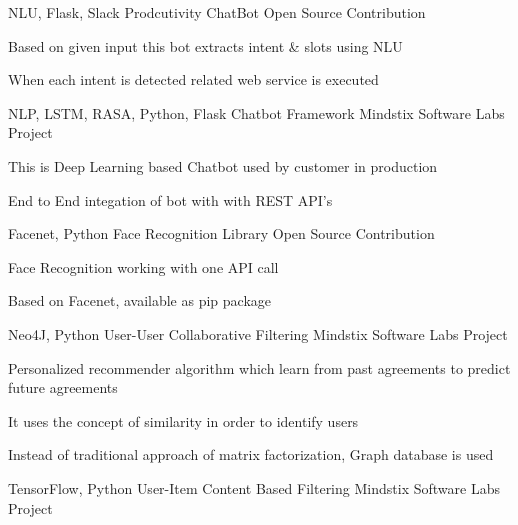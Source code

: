 \begin{cventries}
  \cventry
    {NLU, Flask, Slack} %
    {Prodcutivity ChatBot} %
    {Open Source Contribution} %
    {} %
    {
      \begin{cvitems} %
        \item {Based on given input this bot extracts intent \& slots using NLU}
        \item {When each intent is detected related web service is executed}
      \end{cvitems}
    }
  \cventry
    {NLP, LSTM, RASA, Python, Flask} %
    {Chatbot Framework} %
    {Mindstix Software Labs Project} %
    {} %
    {
      \begin{cvitems} %
        \item {This is Deep Learning based Chatbot used by customer in production}
        \item {End to End integation of bot with with REST API's }
      \end{cvitems}
    }
  \cventry
    {Facenet, Python} %
    {Face Recognition Library} %
    {Open Source Contribution} %
    {} %
    {
      \begin{cvitems} %
        \item {Face Recognition working with one API call}
        \item {Based on Facenet, available as pip package}
      \end{cvitems}
    }
  \cventry
    {Neo4J, Python} %
    {User-User Collaborative Filtering} %
    {Mindstix Software Labs Project} %
    {} %
    {
      \begin{cvitems} %
        \item {Personalized recommender algorithm which learn from past agreements to predict future agreements}
        \item {It uses the concept of similarity in order to identify users}
        \item {Instead of traditional approach of matrix factorization, Graph database is used}
      \end{cvitems}
    }
  \cventry
    {TensorFlow, Python} %
    {User-Item Content Based Filtering} %
    {Mindstix Software Labs Project} %

\end{cventries}
